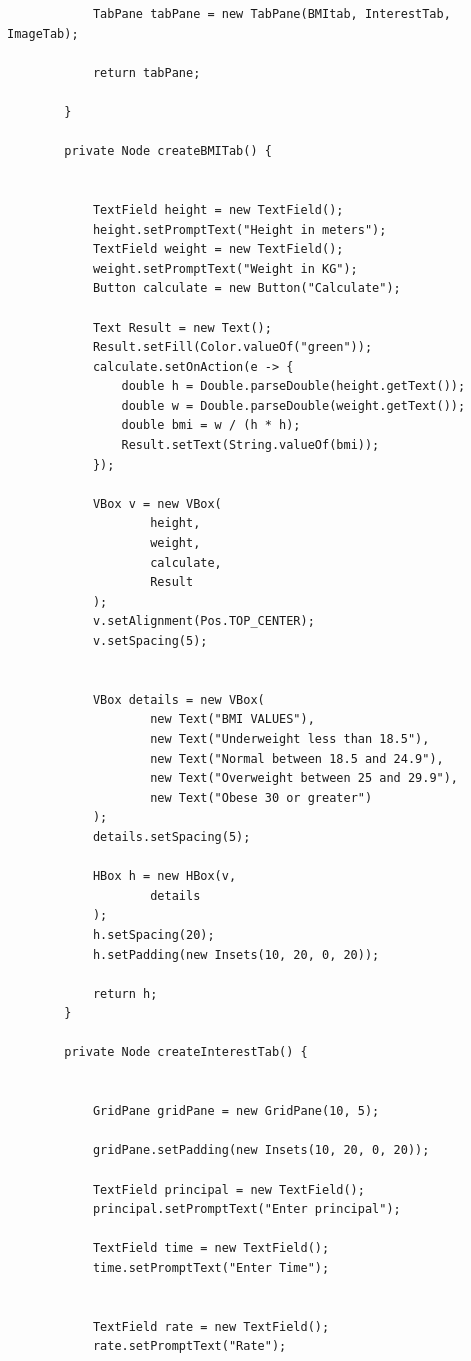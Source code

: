 \documentclass{book}
\begin{document}
{\begin{enumerate}
\begin{verbatim}
            TabPane tabPane = new TabPane(BMItab, InterestTab, ImageTab);

            return tabPane;

        }

        private Node createBMITab() {


            TextField height = new TextField();
            height.setPromptText("Height in meters");
            TextField weight = new TextField();
            weight.setPromptText("Weight in KG");
            Button calculate = new Button("Calculate");

            Text Result = new Text();
            Result.setFill(Color.valueOf("green"));
            calculate.setOnAction(e -> {
                double h = Double.parseDouble(height.getText());
                double w = Double.parseDouble(weight.getText());
                double bmi = w / (h * h);
                Result.setText(String.valueOf(bmi));
            });

            VBox v = new VBox(
                    height,
                    weight,
                    calculate,
                    Result
            );
            v.setAlignment(Pos.TOP_CENTER);
            v.setSpacing(5);


            VBox details = new VBox(
                    new Text("BMI VALUES"),
                    new Text("Underweight less than 18.5"),
                    new Text("Normal between 18.5 and 24.9"),
                    new Text("Overweight between 25 and 29.9"),
                    new Text("Obese 30 or greater")
            );
            details.setSpacing(5);

            HBox h = new HBox(v,
                    details
            );
            h.setSpacing(20);
            h.setPadding(new Insets(10, 20, 0, 20));

            return h;
        }

        private Node createInterestTab() {


            GridPane gridPane = new GridPane(10, 5);

            gridPane.setPadding(new Insets(10, 20, 0, 20));

            TextField principal = new TextField();
            principal.setPromptText("Enter principal");

            TextField time = new TextField();
            time.setPromptText("Enter Time");


            TextField rate = new TextField();
            rate.setPromptText("Rate");


\end{verbatim}
\end{enumerate}}
\end{document}
